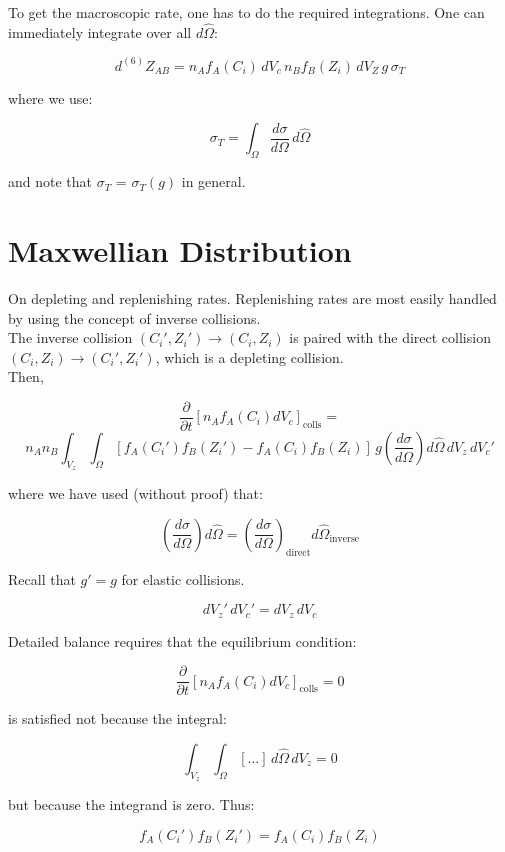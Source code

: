 \documentclass{article}
\begin{document}
To get the macroscopic rate, one has to do the required integrations. One can immediately integrate over all \( d\hat{\Omega} \):

\[
d^{(6)}Z_{AB} = n_A f_A(C_i) \, dV_c \, n_B f_B(Z_i) \, dV_Z \, g \, \sigma_T
\]

where we use:

\[
\sigma_T = \int_{\Omega} \frac{d\sigma}{d\Omega} \, d\hat{\Omega}
\]

and note that $\sigma_T$ = $\sigma_T (g)$ in general.

\section{Maxwellian Distribution}

On depleting and replenishing rates. Replenishing rates are most easily handled by using the concept of inverse collisions.\\

The inverse collision \( (C_i', Z_i') \to (C_i, Z_i) \) is paired with the direct collision \( (C_i, Z_i) \to (C_i', Z_i') \), which is a depleting collision.\\

Then,

\[
\frac{\partial}{\partial t} \left[ n_A f_A(C_i) dV_c \right]_{\text{colls}} = \]
\[n_A n_B \int_{V_z} \int_{\Omega} \left[ f_A(C_i') f_B(Z_i') - f_A(C_i) f_B(Z_i) \right] \, g \left( \frac{d\sigma}{d\Omega} \right) d\hat{\Omega} \, dV_z \, dV_c'
\]

where we have used (without proof) that:

\[
\left( \frac{d\sigma}{d\Omega} \right) d\hat{\Omega} = \left( \frac{d\sigma}{d\Omega} \right)_{\text{direct}} d\hat{\Omega}_{\text{inverse}}
\]

Recall that \( g' = g \) for elastic collisions.

\[
dV_z' \, dV_c' = dV_z \, dV_c
\]

Detailed balance requires that the equilibrium condition:

\[
\frac{\partial}{\partial t} \left[ n_A f_A(C_i) dV_c \right]_{\text{colls}} = 0
\]

is satisfied not because the integral:

\[
\int_{V_z} \int_{\Omega} [ \dots ] \, d\hat{\Omega} \, dV_z = 0
\]

but because the integrand is zero. Thus:

\[
f_A(C_i') f_B(Z_i') = f_A(C_i) f_B(Z_i)
\]
\end{document}
